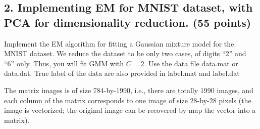 \documentclass[twoside,12pt]{article}
\begin{document}
\subsection*{2. Implementing EM for MNIST dataset, with PCA for dimensionality reduction. (55 points)}

Implement the EM algorithm for fitting a Gaussian mixture model for the MNIST dataset. We reduce the dataset to be only two cases, of digits ``2'' and ``6'' only. Thus, you will fit GMM with $C = 2$. Use the data file \textsf{data.mat} or \textsf{data.dat}. True label of the data are also provided in \textsf{label.mat} and \textsf{label.dat}


The matrix \textsf{images} is of size 784-by-1990, i.e., there are totally 1990 images, and each column of the matrix corresponds to one image of size 28-by-28 pixels (the image is vectorized; the original image can be recovered by map the vector into a matrix). 
\end{document}
